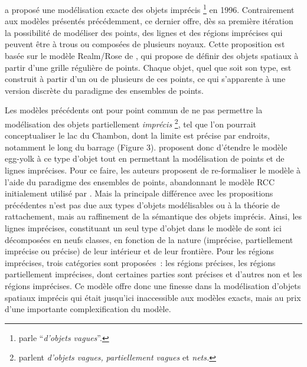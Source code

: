 \textcite{Schneider1996} a proposé une modélisation exacte des objets
imprécis \footnote{\textcite{Schneider1996} parle
  \enquote{\emph{d'objets vagues}}.} en 1996. Contrairement aux
modèles présentés précédemment, ce dernier offre, dès sa première
itération la possibilité de modéliser des points, des lignes et des
régions imprécises qui peuvent être à trous ou composées de plusieurs
noyaux. Cette proposition est basée sur le modèle Realm/Rose de
\textcite{Guting1995}, qui propose de définir des objets spatiaux à
partir d’une grille régulière de points. Chaque objet, quel que soit
son type, est construit à partir d’un ou de plusieurs de ces points,
ce qui s’apparente à une version discrète du paradigme des ensembles
de points.

Les modèles précédents ont pour point commun de ne pas permettre la
modélisation des objets partiellement \emph{imprécis}
\footnote{\textcite{Bejaoui2009,Bejaoui2009a} parlent \emph{d’objets
    vagues,} \emph{partiellement vagues} et \emph{nets.}}, tel que
l’on pourrait conceptualiser le lac du Chambon, dont la limite est
précise par endroits, notamment le long du barrage (Figure
3). \textcite{Bejaoui2009,Bejaoui2009a} proposent donc d’étendre le
modèle egg-yolk à ce type d’objet tout en permettant la modélisation
de points et de lignes imprécises. Pour ce faire, les auteurs
proposent de re-formaliser le modèle à l’aide du paradigme des
ensembles de points, abandonnant le modèle RCC initialement utilisé
par \textcite{Cohn1996}. Mais la principale différence avec les
propositions précédentes n’est pas due aux types d’objets modélisables
ou à la théorie de rattachement, mais au raffinement de la sémantique
des objets imprécis. Ainsi, les lignes imprécises, constituant un seul
type d’objet dans le modèle de \textcite{Clementini2005} sont ici
décomposées en neufs classes, en fonction de la nature (imprécise,
partiellement imprécise ou précise) de leur intérieur et de leur
frontière. Pour les régions imprécises, trois catégories sont
proposées : les régions précises, les régions partiellement
imprécises, dont certaines parties sont précises et d’autres non et
les régions imprécises. Ce modèle offre donc une finesse dans la
modélisation d’objets spatiaux imprécis qui était jusqu’ici
inaccessible aux modèles exacts, mais au prix d’une importante
complexification du modèle.


